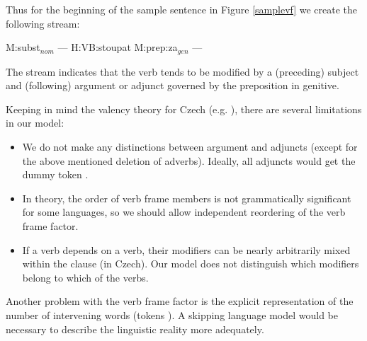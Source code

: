 \documentclass[11pt]{book}
\theoremstyle{plain}
\begin{document}
Thus for the beginning of the sample sentence in Figure \ref{samplevf}
 we create the following stream:

\begin{center}
M:subst$_{nom}$ --- H:VB:stoupat M:prep:za$_{gen}$ ---
\end{center}

The stream indicates that the verb  tends to be modified by a
(preceding) subject and (following) argument or adjunct governed by the
preposition  in genitive.

Keeping in mind the valency theory for Czech (e.g. ),
there are several limitations in our model:

\begin{itemize}

\item We do not make any distinctions between
argument and adjuncts (except for the above mentioned deletion of adverbs).
Ideally, all adjuncts would get the dummy token \text{---}.


\item In theory,
the order of verb frame members is not grammatically significant for some
languages, so we should allow independent reordering of the verb frame factor.


\item If a verb depends on a verb, their modifiers can be nearly arbitrarily mixed
  within the clause (in Czech). Our model does not distinguish which modifiers
  belong to which of the verbs.

\end{itemize}

Another problem with the verb frame factor is the explicit representation of
the number of intervening words (tokens \text{---}). A skipping language model
would be necessary to describe the linguistic reality more adequately.


\end{document}
